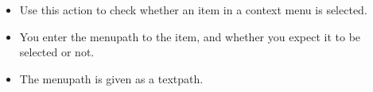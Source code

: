 
\begin{itemize}
\item Use this action to check whether an item in a context menu is selected.
\item You enter the menupath to the item, and whether you expect it to be selected or not.
\item The menupath is given as a textpath. 
\end{itemize}

